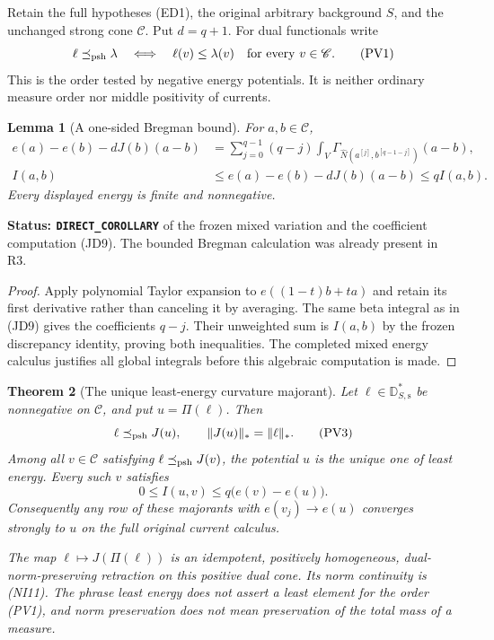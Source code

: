 \documentclass[11pt,a4paper]{article}
\numberwithin{equation}{section}
\newtheorem{theorem}{Theorem}[section]
\newtheorem{lemma}[theorem]{Lemma}
\theoremstyle{definition}
\theoremstyle{remark}
\begin{document}
Retain the full hypotheses (ED1), the original arbitrary background
$S$, and the unchanged strong cone $\mathscr C$. Put $d=q+1$.
For dual functionals write
\[
       \ell\preceq_{\rm psh}\lambda
       \quad\Longleftrightarrow\quad
       \ell(v)\leq\lambda(v)\quad\text{for every }v\in\mathscr C.
 \tag{PV1}
\]
This is the order tested by negative energy potentials. It is
neither ordinary measure order nor middle positivity of currents.

\begin{lemma}[A one-sided Bregman bound]
\label{lem:r12-one-sided-Bregman}
For $a,b\in\mathscr C$,
\[
 \begin{split}
 e(a)-e(b)-dJ(b)(a-b)
  &=\sum_{j=0}^{q-1}(q-j)
       \int_V\Gamma_{\widehat N(a^{[j]},b^{[q-1-j]})}(a-b),\\
 I(a,b)&\leq e(a)-e(b)-dJ(b)(a-b)\leq qI(a,b).
 \end{split}
 \tag{PV2}
\]
Every displayed energy is finite and nonnegative.
\end{lemma}

\noindent\textbf{Status: \texttt{DIRECT\_COROLLARY}} of
the frozen mixed variation and the coefficient computation (JD9).
The bounded Bregman calculation was already present in R3.

\begin{proof}
Apply polynomial Taylor expansion to $e((1-t)b+ta)$ and
retain its first derivative rather than canceling it by
averaging. The same beta integral as in (JD9) gives the
coefficients $q-j$. Their unweighted sum is $I(a,b)$ by
the frozen discrepancy identity, proving both inequalities.
The completed mixed energy calculus justifies all global
integrals before this algebraic computation is made.
\end{proof}

\begin{theorem}[The unique least-energy curvature majorant]
\label{thm:r12-least-energy-curvature-majorant}
Let $\ell\in\mathbb D_{S,\mathrm s}^*$ be nonnegative on
$\mathscr C$, and put $u=\Pi(\ell)$. Then
\[
       \ell\preceq_{\rm psh}J(u),\qquad
       \|J(u)\|_*=\|\ell\|_*.
 \tag{PV3}
\]
Among all $v\in\mathscr C$ satisfying
$\ell\preceq_{\rm psh}J(v)$, the potential $u$ is the
unique one of least energy. Every such $v$ satisfies
\[
               0\leq I(u,v)\leq q\bigl(e(v)-e(u)\bigr).
 \tag{PV4}
\]
Consequently any row of these majorants with
$e(v_j)\to e(u)$ converges strongly to $u$ on the full
original current calculus.

The map $\ell\mapsto J(\Pi(\ell))$ is an idempotent,
positively homogeneous, dual-norm-preserving retraction on
this positive dual cone. Its norm continuity is (NI11).
The phrase \emph{least energy} does not assert a least element
for the order (PV1), and norm preservation does not mean
preservation of the total mass of a measure.
\end{theorem}
\end{document}
